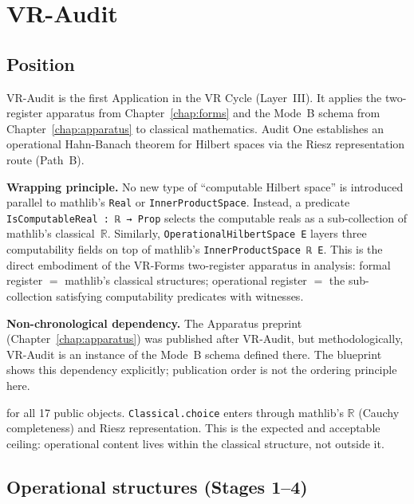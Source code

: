 \chapter{VR-Audit}
\label{chap:audit}

\section{Position}
\label{sec:audit_position}

VR-Audit is the first Application in the VR Cycle (Layer~III).  It applies
the two-register apparatus from Chapter~\ref{chap:forms} and the Mode~B
schema from Chapter~\ref{chap:apparatus} to classical mathematics.  Audit One
establishes an operational Hahn-Banach theorem for Hilbert spaces via the
Riesz representation route (Path~B).

\textbf{Wrapping principle.} No new type of ``computable Hilbert space'' is
introduced parallel to mathlib's \texttt{Real} or \texttt{InnerProductSpace}.
Instead, a predicate \texttt{IsComputableReal : ℝ → Prop} selects the
computable reals as a sub-collection of mathlib's classical~$\mathbb{R}$.
Similarly, \texttt{OperationalHilbertSpace E} layers three computability
fields on top of mathlib's \texttt{InnerProductSpace ℝ E}.  This is the
direct embodiment of the VR-Forms two-register apparatus in analysis:
formal register $=$ mathlib's classical structures; operational register $=$
the sub-collection satisfying computability predicates with witnesses.

\textbf{Non-chronological dependency.} The Apparatus preprint
(Chapter~\ref{chap:apparatus}) was published after VR-Audit, but
methodologically, VR-Audit is an instance of the Mode~B schema defined
there.  The blueprint shows this dependency explicitly; publication order
is not the ordering principle here.

\noindent{} for all
17 public objects.  \texttt{Classical.choice} enters through mathlib's
$\mathbb{R}$ (Cauchy completeness) and Riesz representation.  This is
the expected and acceptable ceiling: operational content lives within
the classical structure, not outside it.

\section{Operational structures (Stages 1--4)}
\label{sec:audit_structures}

